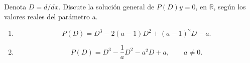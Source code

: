 Denota \(D=d/dx\). Discute la solución general de \(P(D)y=0\), en \(\mathbb R\), según los valores reales del parámetro a.

\begin{enumerate}[label=(\alph*),ref=\alph*,leftmargin=*]
\item \[P(D)=D^3-2(a-1)D^2+(a-1)^2D-a.\]
\item \[P(D)=D^3-\frac1aD^2-a^2D+a,\qquad a\ne0.\]
\end{enumerate}

